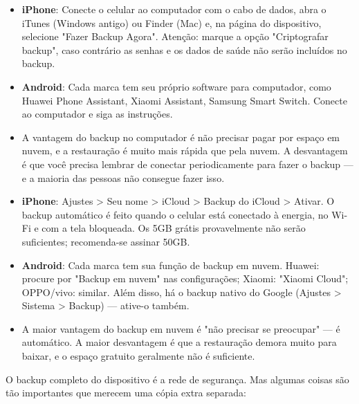\begin{itemize}
  \item \textbf{iPhone}: Conecte o celular ao computador com o cabo de dados, abra o iTunes (Windows antigo) ou Finder (Mac) e, na página do dispositivo, selecione "Fazer Backup Agora". Atenção: marque a opção "Criptografar backup", caso contrário as senhas e os dados de saúde não serão incluídos no backup.
  \item \textbf{Android}: Cada marca tem seu próprio software para computador, como Huawei Phone Assistant, Xiaomi Assistant, Samsung Smart Switch. Conecte ao computador e siga as instruções.
  \item A vantagem do backup no computador é não precisar pagar por espaço em nuvem, e a restauração é muito mais rápida que pela nuvem. A desvantagem é que você precisa lembrar de conectar periodicamente para fazer o backup — e a maioria das pessoas não consegue fazer isso.
\end{itemize}


\begin{itemize}
  \item \textbf{iPhone}: Ajustes > Seu nome > iCloud > Backup do iCloud > Ativar. O backup automático é feito quando o celular está conectado à energia, no Wi-Fi e com a tela bloqueada. Os 5GB grátis provavelmente não serão suficientes; recomenda-se assinar 50GB.
  \item \textbf{Android}: Cada marca tem sua função de backup em nuvem. Huawei: procure por "Backup em nuvem" nas configurações; Xiaomi: "Xiaomi Cloud"; OPPO/vivo: similar. Além disso, há o backup nativo do Google (Ajustes > Sistema > Backup) — ative-o também.
  \item A maior vantagem do backup em nuvem é "não precisar se preocupar" — é automático. A maior desvantagem é que a restauração demora muito para baixar, e o espaço gratuito geralmente não é suficiente.
\end{itemize}


O backup completo do dispositivo é a rede de segurança. Mas algumas coisas são tão importantes que merecem uma cópia extra separada:


